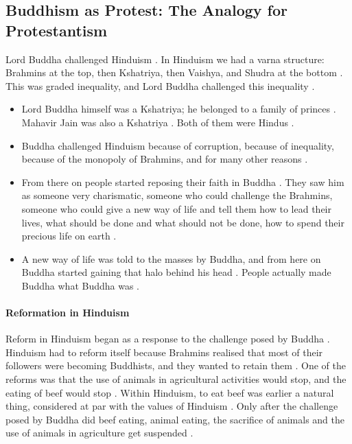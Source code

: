 \subsection{Buddhism as Protest: The Analogy for Protestantism}
Lord Buddha challenged Hinduism . In Hinduism we had a varna structure: Brahmins at the top, then Kshatriya, then Vaishya, and Shudra at the bottom . This was graded inequality, and Lord Buddha challenged this inequality .
\begin{itemize}
    \item Lord Buddha himself was a Kshatriya; he belonged to a family of princes . Mahavir Jain was also a Kshatriya . Both of them were Hindus .
    \item Buddha challenged Hinduism because of corruption, because of inequality, because of the monopoly of Brahmins, and for many other reasons .
    \item From there on people started reposing their faith in Buddha . They saw him as someone very charismatic, someone who could challenge the Brahmins, someone who could give a new way of life and tell them how to lead their lives, what should be done and what should not be done, how to spend their precious life on earth .
    \item A new way of life was told to the masses by Buddha, and from here on Buddha started gaining that halo behind his head . People actually made Buddha what Buddha was .
\end{itemize}

\paragraph{Reformation in Hinduism}
\begin{ExampleBox}
Reform in Hinduism began as a response to the challenge posed by Buddha . Hinduism had to reform itself because Brahmins realised that most of their followers were becoming Buddhists, and they wanted to retain them .
One of the reforms was that the use of animals in agricultural activities would stop, and the eating of beef would stop .
Within Hinduism, to eat beef was earlier a natural thing, considered at par with the values of Hinduism . Only after the challenge posed by Buddha did beef eating, animal eating, the sacrifice of animals and the use of animals in agriculture get suspended .
\end{ExampleBox}

